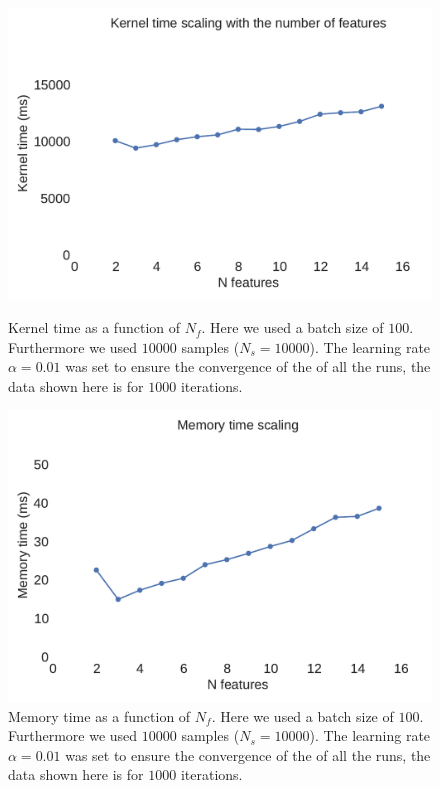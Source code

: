 \documentclass[11pt,a4paper]{article}
\begin{document}
\begin{figure}[H]
	\centering
  \includegraphics[width=\linewidth]{kernel_time_n_features.pdf}
  \caption{Kernel time as a function of $N_f$. Here we used a batch size of $100$. Furthermore we used $10000$ samples ($N_s=10000$). The learning rate $\alpha=0.01$ was set to ensure the convergence of the of all the runs, the data shown here is for $1000$ iterations.}
  \label{fig:n_features_kernel}
\endminipage
\hfill
{}
  \includegraphics[width=\linewidth]{memory_time_n_features.pdf}
  \caption{Memory time as a function of $N_f$. Here we used a batch size of $100$. Furthermore we used $10000$ samples ($N_s=10000$). The learning rate $\alpha=0.01$ was set to ensure the convergence of the of all the runs, the data shown here is for $1000$ iterations.}
  \label{fig:n_features_memory}
\endminipage
\end{figure}
\end{document}
